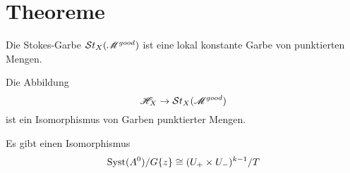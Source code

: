 \TODO[The sheaf $\sH_X$]
\section{Theoreme} %
\begin{thm}
  Die Stokes-Garbe $\mathcal{S}{}t_X(\mathscr{M}^{good})$ ist eine lokal konstante Garbe von
  punktierten Mengen.
\end{thm}
\begin{thm}
  Die Abbildung
  \[
    \mathscr{H}_X\to\mathcal{S}{}t_X(\mathscr{M}^{good})
  \]
  ist ein Isomorphismus von Garben punktierter Mengen.
\end{thm}


\begin{thm}
  Es gibt einen Isomorphismus
  \[
    \operatorname{Syst}(A^0)/G\{z\}\cong(U_+\times U_-)^{k-1}/T
  \]
\end{thm}

